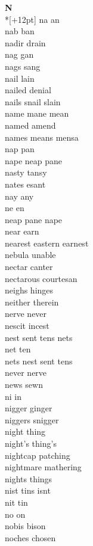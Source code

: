 \vspace{14pt}
\noindent\textbf{\Large N}\\*[+12pt]
na an\\
nab ban\\
nadir drain\\
nag gan\\
nags sang\\
nail lain\\
nailed denial\\
nails snail slain\\
name mane mean\\
named amend\\
names means mensa\\
nap pan\\
nape neap pane\\
nasty tansy\\
nates esant\\
nay any\\
ne en\\
neap pane nape\\
near earn\\
nearest eastern earnest\\
nebula unable\\
nectar canter\\
nectarous courtesan\\
neighs hinges\\
neither therein\\
nerve never\\
nescit incest\\
nest sent tens nets\\
net ten\\
nets nest sent tens\\
never nerve\\
news sewn\\
ni in\\
nigger ginger\\
niggers snigger\\
night thing\\
night's thing's\\
nightcap patching\\
nightmare mathering\\
nights things\\
nist tins isnt\\
nit tin\\
no on\\
nobis bison\\
noches chosen\\
